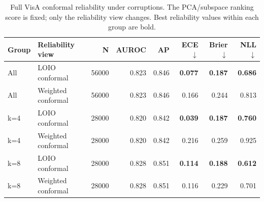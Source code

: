 \begin{table}[t]
\centering
\caption{Full VisA conformal reliability under corruptions. The PCA/subspace ranking score is fixed; only the reliability view changes. Best reliability values within each group are bold.}
\label{tab:visa-full-conformal}
\footnotesize
\begin{tabular}{llrrrrrr}
\toprule
Group & Reliability view & N & AUROC & AP & ECE $\downarrow$ & Brier $\downarrow$ & NLL $\downarrow$ \\
\midrule
All & LOIO conformal & 56000 & 0.823 & 0.846 & \textbf{0.077} & \textbf{0.187} & \textbf{0.686} \\
All & Weighted conformal & 56000 & 0.823 & 0.846 & 0.166 & 0.244 & 0.813 \\
k=4 & LOIO conformal & 28000 & 0.820 & 0.842 & \textbf{0.039} & \textbf{0.187} & \textbf{0.760} \\
k=4 & Weighted conformal & 28000 & 0.820 & 0.842 & 0.216 & 0.259 & 0.925 \\
k=8 & LOIO conformal & 28000 & 0.828 & 0.851 & \textbf{0.114} & \textbf{0.188} & \textbf{0.612} \\
k=8 & Weighted conformal & 28000 & 0.828 & 0.851 & 0.116 & 0.229 & 0.701 \\
\bottomrule
\end{tabular}
\end{table}
